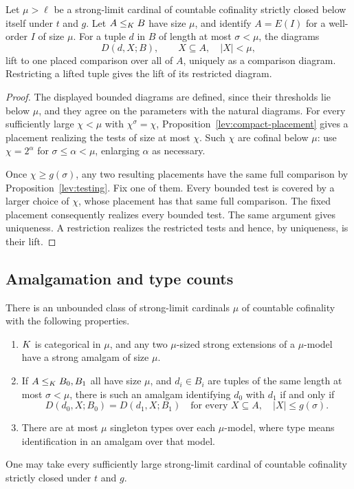 \begin{lemma}
\label{lev:placed-lifts}
Let \(\mu>\ell\) be a strong-limit cardinal of countable
cofinality strictly closed below itself under \(t\) and \(g\).
Let \(A\le_K B\) have size \(\mu\), and identify
\(A=E(I)\) for a well-order \(I\) of size \(\mu\). For a
tuple \(d\) in \(B\) of length at most \(\sigma<\mu\), the
diagrams
\[
 D(d,X;B),\qquad X\subseteq A,\quad |X|<\mu,
\]
lift to one placed comparison over all of \(A\), uniquely
as a comparison diagram. Restricting a lifted tuple gives
the lift of its restricted diagram.
\end{lemma}

\begin{proof}
The displayed bounded diagrams are defined, since their
thresholds lie below \(\mu\), and they agree on the parameters
with the natural diagrams. For every sufficiently large
\(\chi<\mu\) with \(\chi^\sigma=\chi\),
Proposition~\ref{lev:compact-placement} gives a placement
realizing the tests of size at most \(\chi\). Such \(\chi\)
are cofinal below \(\mu\): use \(\chi=2^\alpha\) for
\(\sigma\le\alpha<\mu\), enlarging \(\alpha\) as necessary.

Once \(\chi\ge g(\sigma)\), any two resulting placements
have the same full comparison by Proposition~\ref{lev:testing}.
Fix one of them. Every bounded test is covered by a larger
choice of \(\chi\), whose placement has that same full
comparison. The fixed placement consequently realizes every
bounded test. The same argument gives uniqueness. A
restriction realizes the restricted tests and hence, by
uniqueness, is their lift.
\end{proof}

\subsection{Amalgamation and type counts}

\begin{theorem}
\label{lev:amalgamation}
There is an unbounded class of strong-limit cardinals \(\mu\)
of countable cofinality with the following properties.
\begin{enumerate}
\item \(K\) is categorical in \(\mu\), and any two
\(\mu\)-sized strong extensions of a \(\mu\)-model have a
strong amalgam of size \(\mu\).
\item If \(A\le_K B_0,B_1\) all have size \(\mu\), and
\(d_i\in B_i\) are tuples of the same length at most
\(\sigma<\mu\), there is such an amalgam identifying
\(d_0\) with \(d_1\) if and only if
\[
 D(d_0,X;B_0)=D(d_1,X;B_1)
 \quad\text{for every }X\subseteq A,
 \quad |X|\le g(\sigma).
\]
\item There are at most \(\mu\) singleton types over each
\(\mu\)-model, where type means identification in an amalgam
over that model.
\end{enumerate}
One may take every sufficiently large strong-limit cardinal
of countable cofinality strictly closed under \(t\) and \(g\).
\end{theorem}

